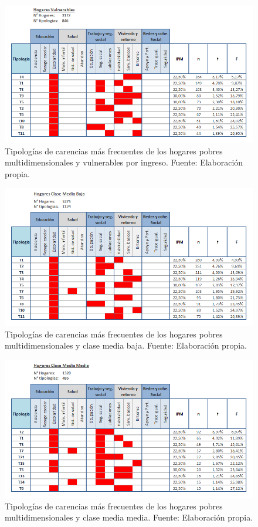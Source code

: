\documentclass[12pt,letterpaper,spanish]{article}
\begin{document}
\begin{figure}[H]
    \centering
    \includegraphics[width=\textwidth]{Max/tipol_vulnerables.png}
    \caption{Tipologías de carencias más frecuentes de los hogares pobres multidimensionales y vulnerables por ingreso. Fuente: Elaboración propia.}
    \label{TipVul}
\end{figure}

\begin{figure}[H]
    \centering
    \includegraphics[width=\textwidth]{Max/tipol_CMB.png}
    \caption{Tipologías de carencias más frecuentes de los hogares pobres multidimensionales y clase media baja. Fuente: Elaboración propia.}
    \label{TipCMB}
\end{figure}

\begin{figure}[H]
    \centering
    \includegraphics[width=\textwidth]{Max/tipol_CMM.png}
    \caption{Tipologías de carencias más frecuentes de los hogares pobres multidimensionales y clase media media. Fuente: Elaboración propia.}
    \label{TipCMM}
\end{figure}
\end{document}

